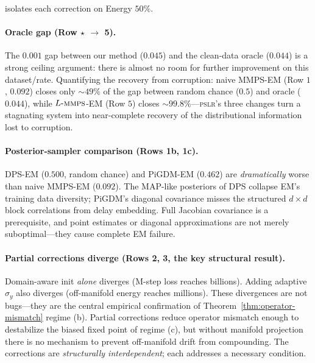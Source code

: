 \documentclass{article}
\theoremstyle{plain}
\theoremstyle{definition}
\theoremstyle{remark}
\newcommand{\pslr}{\textsc{pslr}}
\newcommand{\lmmps}{L\mbox{-}\textsc{mmps}}
\begin{document}
 isolates each correction on Energy $50\%$.

\paragraph{Oracle gap (Row $\star$ $\to$ 5).}
The $0.001$ gap between our method ($0.045$) and the clean-data oracle ($0.044$) is a strong ceiling argument: there is almost no room for further improvement on this dataset/rate. Quantifying the recovery from corruption: naive MMPS-EM (Row $1$, $0.092$) closes only $\sim 49\%$ of the gap between random chance ($0.5$) and oracle ($0.044$), while $\lmmps$-EM (Row $5$) closes $\sim 99.8\%$---\pslr{}'s three changes turn a stagnating system into near-complete recovery of the distributional information lost to corruption.

\paragraph{Posterior-sampler comparison (Rows 1b, 1c).}
DPS-EM ($0.500$, random chance) and PiGDM-EM ($0.462$) are \emph{dramatically} worse than naive MMPS-EM ($0.092$). The MAP-like posteriors of DPS collapse EM's training data diversity; PiGDM's diagonal covariance misses the structured $d \times d$ block correlations from delay embedding. Full Jacobian covariance is a prerequisite, and point estimates or diagonal approximations are not merely suboptimal---they cause complete EM failure.

\paragraph{Partial corrections diverge (Rows 2, 3, the key structural result).}
Domain-aware init \emph{alone} diverges (M-step loss reaches billions). Adding adaptive $\sigma_y$ also diverges (off-manifold energy reaches millions). These divergences are not bugs---they are the central empirical confirmation of Theorem~\ref{thm:operator-mismatch} regime (b). Partial corrections reduce operator mismatch enough to destabilize the biased fixed point of regime (c), but without manifold projection there is no mechanism to prevent off-manifold drift from compounding. The corrections are \emph{structurally interdependent}; each addresses a necessary condition.
\end{document}
